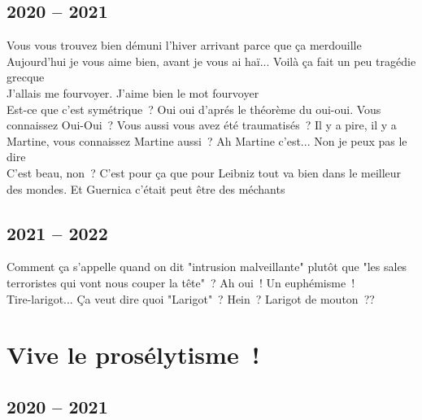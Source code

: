\documentclass[french, a4paper, openany]{book}
\begin{document}
	\subsection*{2020 -- 2021}
		\noindent \og Vous vous trouvez bien démuni l'hiver arrivant parce que ça merdouille \fg \\
		\og Aujourd'hui je vous aime bien, avant je vous ai haï... Voilà ça fait un peu tragédie grecque \fg \\
		\og J'allais me fourvoyer. J'aime bien le mot fourvoyer \fg \\
		\og Est-ce que c'est symétrique~? Oui oui d'aprés le théorème du oui-oui. Vous connaissez Oui-Oui~? Vous aussi vous avez été traumatisés~? Il y a pire, il y a Martine, vous connaissez Martine aussi~? Ah Martine c'est... Non je peux pas le dire \fg \\
		\og C'est beau, non~? C'est pour ça que pour Leibniz tout va bien dans le meilleur des mondes. Et Guernica c'était peut être des méchants \fg \\	

	\subsection*{2021 -- 2022}
		\noindent \og Comment ça s'appelle quand on dit "intrusion malveillante" plutôt que "les sales terroristes qui vont nous couper la tête"~? Ah oui~! Un euphémisme~! \fg \\
		\og Tire-larigot... Ça veut dire quoi "Larigot"~? Hein~? Larigot de mouton~?? \fg \\

\section*{Vive le prosélytisme~!} 

	\subsection*{2020 -- 2021}
 
\end{document}
